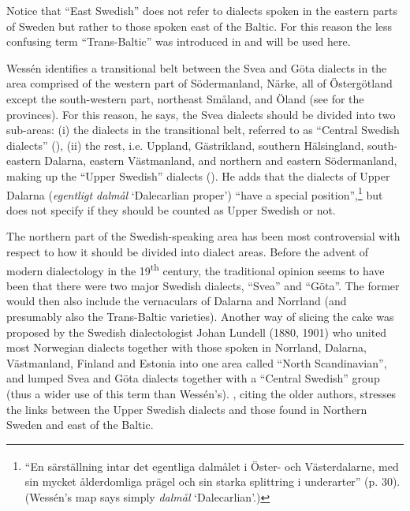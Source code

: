 
Notice that “East Swedish” does not refer to dialects spoken in the eastern parts of Sweden but rather to those spoken east of the Baltic. For this reason the less confusing term “Trans-Baltic” was introduced in \citet{Rendahl2001} and will be used here.

Wessén identifies a transitional belt between the Svea and Göta dialects in the area comprised of the western part of Södermanland, Närke, all of Östergötland except the south-western part, northeast Småland, and Öland (see  for the provinces). For this reason, he says, the Svea dialects should be divided into two sub-areas: (i) the dialects in the transitional belt, referred to as “Central Swedish dialects” (), (ii) the rest, i.e. Uppland, Gästrikland, southern Hälsingland, south-eastern Dalarna, eastern Västmanland, and northern and eastern Södermanland, making up the “Upper Swedish” dialects (). He adds that the dialects of Upper Dalarna (\textit{egentligt dalmål} ‘Dalecarlian proper’) \label{bkm:wessenquote}“have a special position”,\footnote{\textsuperscript{ }“En särställning intar det egentliga dalmålet i Öster- och Västerdalarne, med sin mycket ålderdomliga prägel och sin starka splittring i underarter” (p. 30).  (Wessén’s map says simply \textit{dalmål} ‘Dalecarlian’.)} but does not specify if they should be counted as Upper Swedish or not.

The northern part of the Swedish-speaking area has been most controversial with respect to how it should be divided into dialect areas. Before the advent of modern dialectology in the 19\textsuperscript{th} century, the traditional opinion seems to have been that there were two major Swedish dialects, “Svea” and “Göta”. The former would then also include the vernaculars of Dalarna and Norrland (and presumably also the Trans-Baltic varieties). Another way of slicing the cake was proposed by the Swedish dialectologist Johan Lundell (1880, 1901) who united most Norwegian dialects together with those spoken in Norrland, Dalarna, Västmanland, Finland and Estonia into one area called “North Scandinavian”, and lumped Svea and Göta dialects together with a “Central Swedish” group (thus a wider use of this term than Wessén’s). \citet{Hesselman1905}, citing the older authors, stresses the links between the Upper Swedish dialects and those found in Northern Sweden and east of the Baltic. 

